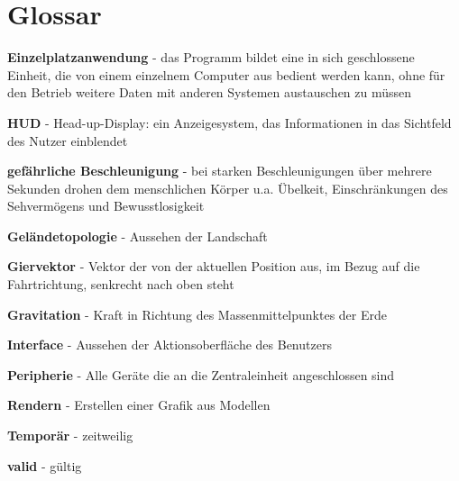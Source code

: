 
\chapter{Glossar}

\textbf{Einzelplatzanwendung} - das Programm bildet eine in sich geschlossene Einheit, die von einem einzelnem Computer aus bedient werden kann, ohne für den Betrieb weitere Daten mit anderen Systemen austauschen zu müssen

\textbf{HUD} - Head-up-Display: ein Anzeigesystem, das Informationen in das Sichtfeld des Nutzer einblendet

\textbf{gefährliche Beschleunigung} - bei starken Beschleunigungen über mehrere Sekunden 
drohen dem menschlichen Körper u.a. Übelkeit, Einschränkungen des Sehvermögens und Bewusstlosigkeit

\textbf{Geländetopologie} - Aussehen der Landschaft

\textbf{Giervektor} - Vektor der von der aktuellen Position aus, im Bezug auf die Fahrtrichtung, senkrecht nach oben steht

\textbf{Gravitation} - Kraft in Richtung des Massenmittelpunktes der Erde

\textbf{Interface} - Aussehen der Aktionsoberfläche des Benutzers 

\textbf{Peripherie} - Alle Geräte die an die Zentraleinheit angeschlossen sind

\textbf{Rendern} - Erstellen einer Grafik aus Modellen

\textbf{Temporär} - zeitweilig

\textbf{valid} - gültig


%

